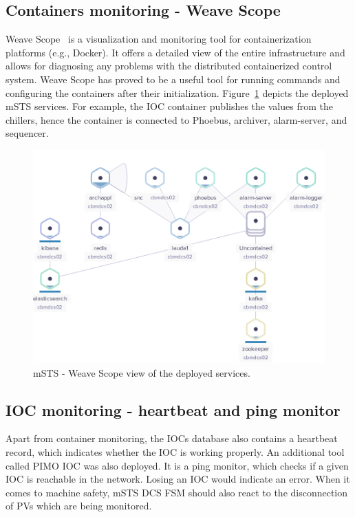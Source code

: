\subsection{Containers monitoring - Weave Scope}

Weave Scope~\cite{weavescope} is a visualization and monitoring tool for containerization platforms (e.g., Docker). It offers a detailed view of the entire infrastructure and allows for diagnosing any problems with the distributed containerized control system. Weave Scope has proved to be a useful tool for running commands and configuring the containers after their initialization. Figure~\ref{fig_weave} depicts the deployed \gls{mSTS} services. For example, the \gls{IOC} container publishes the values from the chillers, hence the container is connected to Phoebus, archiver, alarm-server, and sequencer.
\begin{figure}[!h]
\centering
\includegraphics[width=0.85\columnwidth]{Chapter6/DCS/images/weave.png}
\caption{mSTS - Weave Scope view of the deployed services.}
\label{fig_weave}
\end{figure}
\subsection{IOC monitoring - heartbeat and ping monitor}
Apart from container monitoring, the \glspl{IOC} database also contains a heartbeat record, which indicates whether the \gls{IOC} is working properly. An additional tool called PIMO \gls{IOC} was also deployed. It is a ping monitor, which checks if a given \gls{IOC} is reachable in the network. Losing an \gls{IOC} would indicate an error. When it comes to machine safety, \gls{mSTS} \gls{DCS} \gls{FSM} should also react to the disconnection of \glspl{PV} which are being monitored.
